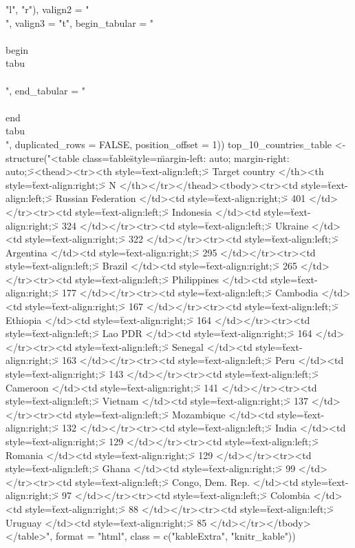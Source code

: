     "l", "r"), valign2 = "\\[t\\]", valign3 = "t", begin_tabular = "\\\\begin\\{tabu\\}\\[t\\]", 
    end_tabular = "\\\\end\\{tabu\\}", duplicated_rows = FALSE, 
    position_offset = 1))
top_10_countries_table <-
structure("<table class=\"table\" style=\"margin-left: auto; margin-right: auto;\">\n <thead>\n  <tr>\n   <th style=\"text-align:left;\"> Target country </th>\n   <th style=\"text-align:right;\"> N </th>\n  </tr>\n </thead>\n<tbody>\n  <tr>\n   <td style=\"text-align:left;\"> Russian Federation </td>\n   <td style=\"text-align:right;\"> 401 </td>\n  </tr>\n  <tr>\n   <td style=\"text-align:left;\"> Indonesia </td>\n   <td style=\"text-align:right;\"> 324 </td>\n  </tr>\n  <tr>\n   <td style=\"text-align:left;\"> Ukraine </td>\n   <td style=\"text-align:right;\"> 322 </td>\n  </tr>\n  <tr>\n   <td style=\"text-align:left;\"> Argentina </td>\n   <td style=\"text-align:right;\"> 295 </td>\n  </tr>\n  <tr>\n   <td style=\"text-align:left;\"> Brazil </td>\n   <td style=\"text-align:right;\"> 265 </td>\n  </tr>\n  <tr>\n   <td style=\"text-align:left;\"> Philippines </td>\n   <td style=\"text-align:right;\"> 177 </td>\n  </tr>\n  <tr>\n   <td style=\"text-align:left;\"> Cambodia </td>\n   <td style=\"text-align:right;\"> 167 </td>\n  </tr>\n  <tr>\n   <td style=\"text-align:left;\"> Ethiopia </td>\n   <td style=\"text-align:right;\"> 164 </td>\n  </tr>\n  <tr>\n   <td style=\"text-align:left;\"> Lao PDR </td>\n   <td style=\"text-align:right;\"> 164 </td>\n  </tr>\n  <tr>\n   <td style=\"text-align:left;\"> Senegal </td>\n   <td style=\"text-align:right;\"> 163 </td>\n  </tr>\n  <tr>\n   <td style=\"text-align:left;\"> Peru </td>\n   <td style=\"text-align:right;\"> 143 </td>\n  </tr>\n  <tr>\n   <td style=\"text-align:left;\"> Cameroon </td>\n   <td style=\"text-align:right;\"> 141 </td>\n  </tr>\n  <tr>\n   <td style=\"text-align:left;\"> Vietnam </td>\n   <td style=\"text-align:right;\"> 137 </td>\n  </tr>\n  <tr>\n   <td style=\"text-align:left;\"> Mozambique </td>\n   <td style=\"text-align:right;\"> 132 </td>\n  </tr>\n  <tr>\n   <td style=\"text-align:left;\"> India </td>\n   <td style=\"text-align:right;\"> 129 </td>\n  </tr>\n  <tr>\n   <td style=\"text-align:left;\"> Romania </td>\n   <td style=\"text-align:right;\"> 129 </td>\n  </tr>\n  <tr>\n   <td style=\"text-align:left;\"> Ghana </td>\n   <td style=\"text-align:right;\"> 99 </td>\n  </tr>\n  <tr>\n   <td style=\"text-align:left;\"> Congo, Dem. Rep. </td>\n   <td style=\"text-align:right;\"> 97 </td>\n  </tr>\n  <tr>\n   <td style=\"text-align:left;\"> Colombia </td>\n   <td style=\"text-align:right;\"> 88 </td>\n  </tr>\n  <tr>\n   <td style=\"text-align:left;\"> Uruguay </td>\n   <td style=\"text-align:right;\"> 85 </td>\n  </tr>\n</tbody>\n</table>", format = "html", class = c("kableExtra", 
"knitr_kable"))

